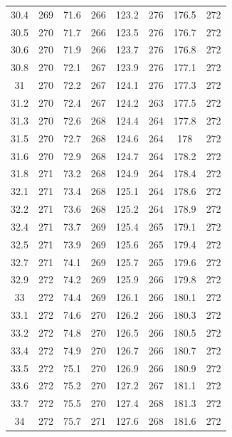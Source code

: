 \documentclass[12pt]{ctexart}
\numberwithin{equation}{section}
\begin{document}
\begin{longtable}{cc|cc|cc|cc}
30.4  &  269  &  71.6  &  266  &  123.2  &  276  &  176.5  &  272  \\
30.5  &  270  &  71.7  &  266  &  123.5  &  276  &  176.7  &  272  \\
30.6  &  270  &  71.9  &  266  &  123.7  &  276  &  176.8  &  272  \\
30.8  &  270  &  72.1  &  267  &  123.9  &  276  &  177.1  &  272  \\
31  &  270  &  72.2  &  267  &  124.1  &  276  &  177.3  &  272  \\
31.2  &  270  &  72.4  &  267  &  124.2  &  263  &  177.5  &  272  \\
31.3  &  270  &  72.6  &  268  &  124.4  &  264  &  177.8  &  272  \\
31.5  &  270  &  72.7  &  268  &  124.6  &  264  &  178  &  272  \\
31.6  &  270  &  72.9  &  268  &  124.7  &  264  &  178.2  &  272  \\
31.8  &  271  &  73.2  &  268  &  124.9  &  264  &  178.4  &  272  \\
32.1  &  271  &  73.4  &  268  &  125.1  &  264  &  178.6  &  272  \\
32.2  &  271  &  73.6  &  268  &  125.2  &  264  &  178.9  &  272  \\
32.4  &  271  &  73.7  &  269  &  125.4  &  265  &  179.1  &  272  \\
32.5  &  271  &  73.9  &  269  &  125.6  &  265  &  179.4  &  272  \\
32.7  &  271  &  74.1  &  269  &  125.7  &  265  &  179.6  &  272  \\
32.9  &  272  &  74.2  &  269  &  125.9  &  266  &  179.8  &  272  \\
33  &  272  &  74.4  &  269  &  126.1  &  266  &  180.1  &  272  \\
33.1  &  272  &  74.6  &  270  &  126.2  &  266  &  180.3  &  272  \\
33.2  &  272  &  74.8  &  270  &  126.5  &  266  &  180.5  &  272  \\
33.4  &  272  &  74.9  &  270  &  126.7  &  266  &  180.7  &  272  \\
33.5  &  272  &  75.1  &  270  &  126.9  &  266  &  180.9  &  272  \\
33.6  &  272  &  75.2  &  270  &  127.2  &  267  &  181.1  &  272  \\
33.7  &  272  &  75.5  &  270  &  127.4  &  268  &  181.3  &  272  \\
34  &  272  &  75.7  &  271  &  127.6  &  268  &  181.6  &  272  \\

\end{longtable}
\end{document}
